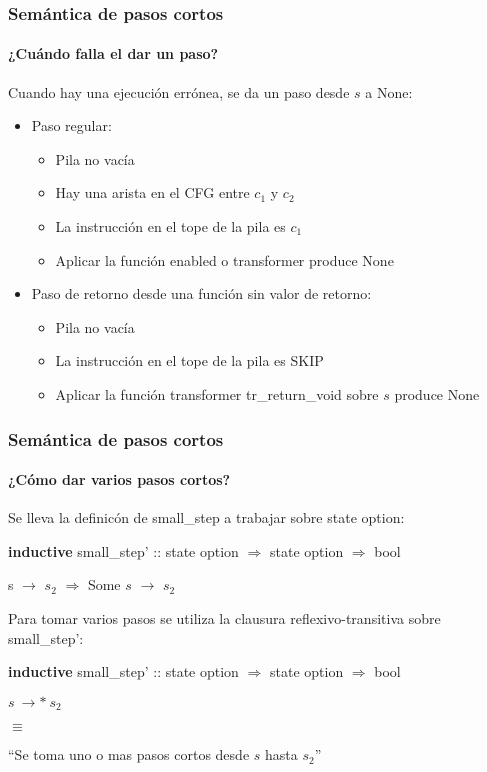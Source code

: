 \begin{frame}
\frametitle{Semántica de pasos cortos}
\framesubtitle{¿Cuándo falla el dar un paso?}

Cuando hay una ejecución errónea, se da un paso desde $s$ a None:
\begin{itemize}
\item{Paso regular:}
\begin{itemize}
\item{Pila no vacía}
\item{Hay una arista en el CFG entre $c_1$ y $c_2$}
\item{La instrucción en el tope de la pila es $c_1$}
\item{Aplicar la función enabled o transformer produce None}
\end{itemize}
\item{Paso de retorno desde una función sin valor de retorno:}
\begin{itemize}
\item{Pila no vacía}
\item{La instrucción en el tope de la pila es SKIP}
\item{Aplicar la función transformer tr\_return\_void sobre $s$ produce None}
\end{itemize}
\end{itemize}


\end{frame}


\begin{frame}
\frametitle{Semántica de pasos cortos}
\framesubtitle{¿Cómo dar varios pasos cortos?}

Se lleva la definicón de small\_step a trabajar sobre state option:

\bigskip
\textbf{inductive} small\_step' :: state option $\Rightarrow$ state option $\Rightarrow$ bool
\bigskip

s $\rightarrow$ $s_2$ $\Longrightarrow$ Some $s$ $\rightarrow$ $s_2$
\bigskip
\pause

Para tomar varios pasos se utiliza la clausura reflexivo-transitiva sobre small\_step':

\bigskip
\textbf{inductive} small\_step' :: state option $\Rightarrow$ state option $\Rightarrow$ bool
\bigskip

$s\ \rightarrow*\ s_2$

$\equiv$

``Se toma uno o mas pasos cortos desde $s$ hasta $s_2$''



\end{frame}


